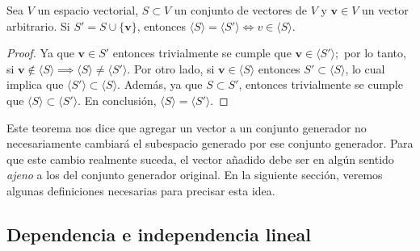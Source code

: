 \documentclass[12pt]{article}
\newenvironment{teorema}[2][Teorema]{\begin{trivlist}
\item[\hskip \labelsep {\bfseries #1}\hskip \labelsep {\bfseries #2.}]}{\end{trivlist}}
\begin{document}
\begin{teorema} {3.2.1} 
Sea $V$ un espacio vectorial, $S\subset V$ un conjunto de vectores de $V$ y $\mathbf{v}\in V$ un vector arbitrario. Si $S'=S\cup\{\mathbf{v}\}$, entonces $\langle S \rangle = \langle S' \rangle \iff v\in\langle S \rangle.$

\begin{proof}
Ya que $\mathbf{v}\in S'$ entonces trivialmente se cumple que $\mathbf{v}\in\langle S'\rangle;$ por lo tanto, si $\mathbf{v}\notin \langle S \rangle \implies \langle S \rangle \neq \langle S' \rangle.$ Por otro lado, si $\mathbf{v}\in\langle S \rangle$ entonces $S'\subset\langle S \rangle$, lo cual implica que $\langle S' \rangle \subset \langle S \rangle.$ Además, ya que $S\subset S'$, entonces trivialmente se cumple que $\langle S \rangle \subset \langle S' \rangle.$ En conclusión, $\langle S \rangle =\langle S' \rangle.$
\end{proof}
        
    Este teorema nos dice que agregar un vector a un conjunto generador no necesariamente cambiará el subespacio generado por ese conjunto generador. Para que este cambio realmente suceda, el vector añadido debe ser en algún sentido \emph{ajeno} a los del conjunto generador original. En la siguiente sección, veremos algunas definiciones necesarias para precisar esta idea.

\end{teorema}

\subsection{Dependencia e independencia lineal}
\end{document}
